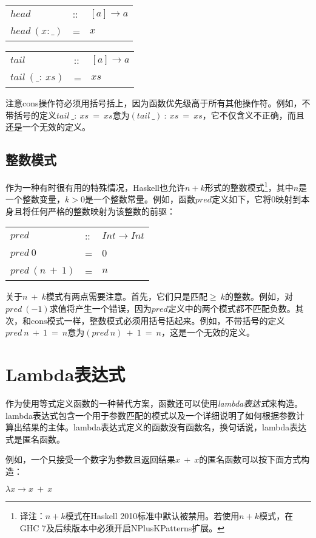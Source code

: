 \begin{tabular}[t]{lll}
$head$&::&$[a] \rightarrow a$\\
$head~(x:\_)$&=&$x$\\
\end{tabular}

\begin{tabular}[t]{lll}
$tail$&::&$[a] \rightarrow a$\\
$tail~(\_:~xs)$&=&$xs$\\
\end{tabular}

注意cons操作符必须用括号括上，因为函数优先级高于所有其他操作符。例如，不带括号的定义$tail~\_:~xs~=~xs$意为$(tail~\_)~:~xs~=~xs$，它不仅含义不正确，而且还是一个无效的定义。

\subsection*{整数模式}
作为一种有时很有用的特殊情况，Haskell也允许$n + k$形式的整数模式\footnote{译注：$n+k$模式在Haskell 2010标准中默认被禁用。若使用$n+k$模式，在GHC 7及后续版本中必须开启NPlusKPatterns扩展。}，其中$n$是一个整数变量，$k > 0$是一个整数常量。例如，函数$pred$定义如下，它将0映射到本身且将任何严格的整数映射为该整数的前驱：

\begin{tabular}[t]{lll}
$pred$&::&$Int \rightarrow Int$\\
$pred~0$&=&$0$\\
$pred~(n~+~1)$&=&$n$\\
\end{tabular}

关于$n~+~k$模式有两点需要注意。首先，它们只是匹配$\geq ~k$的整数。例如，对$pred~(-1)$求值将产生一个错误，因为$pred$定义中的两个模式都不匹配负数。其次，和cons模式一样，整数模式必须用括号括起来。例如，不带括号的定义$pred~n~+~1~=~n$意为$(pred~n)~+~1~=~n$，这是一个无效的定义。

\section{Lambda表达式}
作为使用等式定义函数的一种替代方案，函数还可以使用\textit{lambda表达式}来构造。lambda表达式包含一个用于参数匹配的模式以及一个详细说明了如何根据参数计算出结果的主体。lambda表达式定义的函数没有函数名，换句话说，lambda表达式是匿名函数。

例如，一个只接受一个数字为参数且返回结果$x~+~x$的匿名函数可以按下面方式构造：

\noindent\hspace*{1cm} $\lambda x \rightarrow x~+~x$

